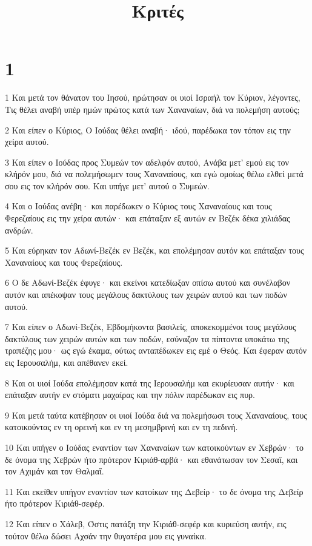 

\title{Κριτές}


\chapter{1}

\par 1 Και μετά τον θάνατον του Ιησού, ηρώτησαν οι υιοί Ισραήλ τον Κύριον, λέγοντες, Τις θέλει αναβή υπέρ ημών πρώτος κατά των Χαναναίων, διά να πολεμήση αυτούς;
\par 2 Και είπεν ο Κύριος, Ο Ιούδας θέλει αναβή· ιδού, παρέδωκα τον τόπον εις την χείρα αυτού.
\par 3 Και είπεν ο Ιούδας προς Συμεών τον αδελφόν αυτού, Ανάβα μετ' εμού εις τον κλήρόν μου, διά να πολεμήσωμεν τους Χαναναίους, και εγώ ομοίως θέλω ελθεί μετά σου εις τον κλήρόν σου. Και υπήγε μετ' αυτού ο Συμεών.
\par 4 Και ο Ιούδας ανέβη· και παρέδωκεν ο Κύριος τους Χαναναίους και τους Φερεζαίους εις την χείρα αυτών· και επάταξαν εξ αυτών εν Βεζέκ δέκα χιλιάδας ανδρών.
\par 5 Και εύρηκαν τον Αδωνί-Βεζέκ εν Βεζέκ, και επολέμησαν αυτόν και επάταξαν τους Χαναναίους και τους Φερεζαίους.
\par 6 Ο δε Αδωνί-Βεζέκ έφυγε· και εκείνοι κατεδίωξαν οπίσω αυτού και συνέλαβον αυτόν και απέκοψαν τους μεγάλους δακτύλους των χειρών αυτού και των ποδών αυτού.
\par 7 Και είπεν ο Αδωνί-Βεζέκ, Εβδομήκοντα βασιλείς, αποκεκομμένοι τους μεγάλους δακτύλους των χειρών αυτών και των ποδών, εσύναζον τα πίπτοντα υποκάτω της τραπέζης μου· ως εγώ έκαμα, ούτως ανταπέδωκεν εις εμέ ο Θεός. Και έφεραν αυτόν εις Ιερουσαλήμ, και απέθανεν εκεί.
\par 8 Και οι υιοί Ιούδα επολέμησαν κατά της Ιερουσαλήμ και εκυρίευσαν αυτήν· και επάταξαν αυτήν εν στόματι μαχαίρας και την πόλιν παρέδωκαν εις πυρ.
\par 9 Και μετά ταύτα κατέβησαν οι υιοί Ιούδα διά να πολεμήσωσι τους Χαναναίους, τους κατοικούντας εν τη ορεινή και εν τη μεσημβρινή και εν τη πεδινή.
\par 10 Και υπήγεν ο Ιούδας εναντίον των Χαναναίων των κατοικούντων εν Χεβρών· το δε όνομα της Χεβρών ήτο πρότερον Κιριάθ-αρβά· και εθανάτωσαν τον Σεσαΐ, και τον Αχιμάν και τον Θαλμαΐ.
\par 11 Και εκείθεν υπήγον εναντίον των κατοίκων της Δεβείρ· το δε όνομα της Δεβείρ ήτο πρότερον Κιριάθ-σεφέρ.
\par 12 Και είπεν ο Χάλεβ, Όστις πατάξη την Κιριάθ-σεφέρ και κυριεύση αυτήν, εις τούτον θέλω δώσει Αχσάν την θυγατέρα μου εις γυναίκα.
